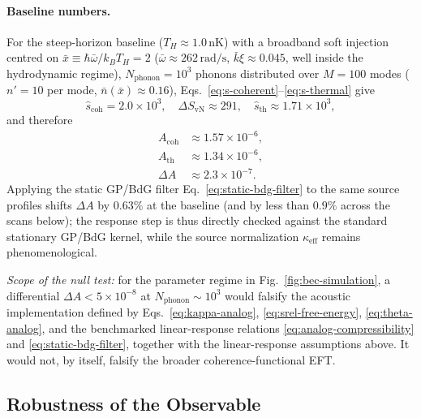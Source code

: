 \documentclass[aps,prd,twocolumn,superscriptaddress,nofootinbib,floatfix]{revtex4-2}
\begin{document}
\paragraph{Baseline numbers.} For the steep-horizon baseline ($T_H \approx 1.0\,\mathrm{nK}$) with a broadband soft injection centred on $\bar{x} \equiv \hbar\bar{\omega}/k_B T_H = 2$ ($\bar{\omega} \approx 262\,\mathrm{rad/s}$, $\bar{k}\xi \approx 0.045$, well inside the hydrodynamic regime), $N_{\mathrm{phonon}} = 10^3$ phonons distributed over $M = 100$ modes ($n' = 10$ per mode, $\bar{n}(\bar{x}) \approx 0.16$), Eqs.~\eqref{eq:s-coherent}--\eqref{eq:s-thermal} give
\begin{equation}
    \hat{s}_{\mathrm{coh}} = 2.0\times10^{3}, \quad
    \Delta S_{\mathrm{vN}} \approx 291, \quad
    \hat{s}_{\mathrm{th}} \approx 1.71\times10^{3},
\end{equation}
and therefore
\begin{equation}
    \boxed{
    \begin{aligned}
    A_{\mathrm{coh}} &\approx 1.57\times 10^{-6}, \\
    A_{\mathrm{th}} &\approx 1.34\times 10^{-6}, \\
    \Delta A &\approx 2.3\times 10^{-7}.
    \end{aligned}}
    \label{eq:analog-density-prediction}
\end{equation}
Applying the static GP/BdG filter Eq.~\eqref{eq:static-bdg-filter} to the same source profiles shifts $\Delta A$ by $0.63\%$ at the baseline (and by less than $0.9\%$ across the scans below); the response step is thus directly checked against the standard stationary GP/BdG kernel, while the source normalization $\kappa_{\mathrm{eff}}$ remains phenomenological.

\emph{Scope of the null test:} for the parameter regime in Fig.~\ref{fig:bec-simulation}, a differential $\Delta A < 5\times10^{-8}$ at $N_{\mathrm{phonon}}\sim 10^3$ would falsify the acoustic implementation defined by Eqs.~\eqref{eq:kappa-analog}, \eqref{eq:srel-free-energy}, \eqref{eq:theta-analog}, and the benchmarked linear-response relations \eqref{eq:analog-compressibility} and \eqref{eq:static-bdg-filter}, together with the linear-response assumptions above. It would not, by itself, falsify the broader coherence-functional EFT.

\subsection{Robustness of the Observable}
\end{document}
